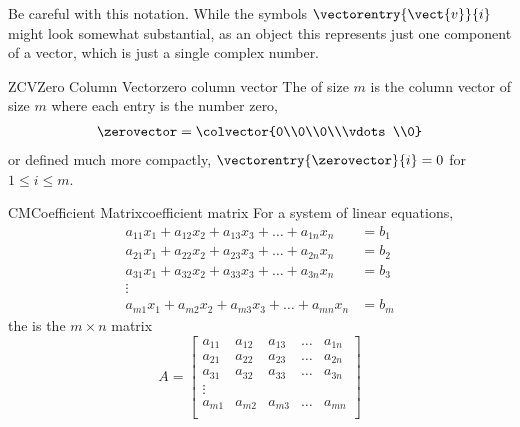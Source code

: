 %
Be careful with this notation.  While the symbols $\vectorentry{\vect{v}}{i}$ might look somewhat substantial, as an object this represents just one component of a vector, which is just a single complex number.
%
\begin{definition}{ZCV}{Zero Column Vector}{zero column vector}
The  of size $m$ is the column vector of size $m$ where each entry is the number zero,
%
\begin{align*}
\zerovector=
\colvector{0\\0\\0\\\vdots\\0}
\end{align*}
%
or defined much more compactly, $\vectorentry{\zerovector}{i}=0$ for $1\leq i\leq m$.
\end{definition}
%
\begin{definition}{CM}{Coefficient Matrix}{coefficient matrix}
For a system of linear equations, 
\begin{align*}
a_{11}x_1+a_{12}x_2+a_{13}x_3+\dots+a_{1n}x_n&=b_1\\
a_{21}x_1+a_{22}x_2+a_{23}x_3+\dots+a_{2n}x_n&=b_2\\
a_{31}x_1+a_{32}x_2+a_{33}x_3+\dots+a_{3n}x_n&=b_3\\
\vdots&\\
a_{m1}x_1+a_{m2}x_2+a_{m3}x_3+\dots+a_{mn}x_n&=b_m
\end{align*}
the  is the $m\times n$ matrix
\begin{equation*}
A=
\begin{bmatrix}
a_{11}&a_{12}&a_{13}&\dots&a_{1n}\\
a_{21}&a_{22}&a_{23}&\dots&a_{2n}\\
a_{31}&a_{32}&a_{33}&\dots&a_{3n}\\
\vdots&\\
a_{m1}&a_{m2}&a_{m3}&\dots&a_{mn}\\
\end{bmatrix}
\end{equation*}
\end{definition}
%
